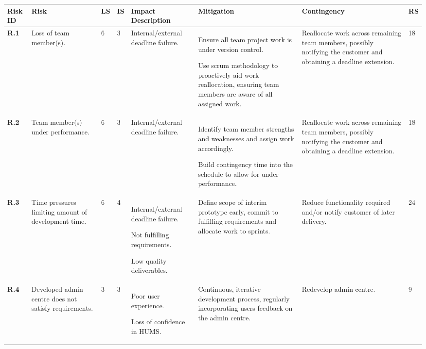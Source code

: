 \begin{longtable}[H]{| p{0.6cm} | p{2.2cm} | p{0.26cm} | p{0.26cm} | p{2.7cm} | p{3cm} | p{2.6cm} | p{0.4cm} |}
  \hline
  \cellcolor{titleColor}\textbf{Risk ID} &
  \cellcolor{titleColor}\textbf{Risk} &
  \cellcolor{titleColor}\textbf{LS} &
  \cellcolor{titleColor}\textbf{IS} &
  \cellcolor{titleColor}\textbf{Impact Description} &
  \cellcolor{titleColor}\textbf{Mitigation} &
  \cellcolor{titleColor}\textbf{Contingency} &
  \cellcolor{titleColor}\textbf{RS}\\
  
  \hline \textbf{R.1}
  & Loss of team member(s).
  & 6
  & 3
  & Internal/external deadline failure.
  & Ensure all team project work is under version control.
 
  Use scrum methodology to proactively aid work reallocation, ensuring team members are aware of all assigned work.
  & Reallocate work across remaining team members, possibly notifying the customer and obtaining a deadline extension.
  & 18 \\
  
  \hline \textbf{R.2}
  & Team member(s) under performance.
  & 6
  & 3
  & Internal/external deadline failure.
  & Identify team member strengths and weaknesses and assign work accordingly. 
  
  Build contingency time into the schedule to allow for under performance.
  & Reallocate work across remaining team members, possibly notifying the customer and obtaining a deadline extension.
  & 18 \\
  
  \hline \textbf{R.3}
  & Time pressures limiting amount of development time.
  & 6
  & 4
  & Internal/external deadline failure.
  
  Not fulfilling requirements.
  
  Low quality deliverables.
  & Define scope of interim prototype early, commit to fulfilling requirements and allocate work to sprints.
  & Reduce functionality required and/or notify customer of later delivery.
  & 24 \\
  
  \hline \textbf{R.4}
  & Developed admin centre does not satisfy requirements.
  & 3
  & 3
  & Poor user experience.
  
  Loss of confidence in HUMS.
  & Continuous, iterative development process, regularly incorporating users feedback on the admin centre.
  & Redevelop admin centre.
  & 9\\
  

\end{longtable}
